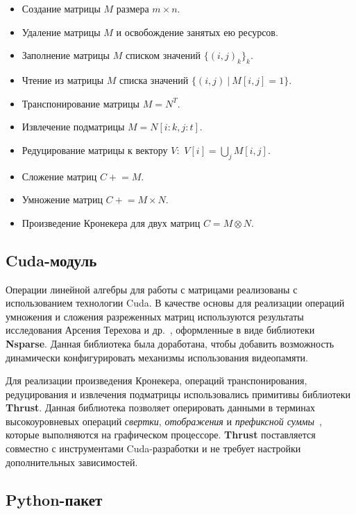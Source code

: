 \begin{itemize}[noitemsep,topsep=0pt,parsep=0pt,partopsep=0pt]
    \item Создание матрицы $M$ размера $m \times n$.
    \item Удаление матрицы $M$ и освобождение занятых ею ресурсов.
    \item Заполнение матрицы $M$ списком значений $\{(i, j)_k\}_k$.
    \item Чтение из матрицы $M$ списка значений $\{(i, j)~|~M[i,j]=1\}$.
    \item Транспонирование матрицы $M = N^T$.
    \item Извлечение подматрицы $M = N[i:k, j:t]$.
    \item Редуцирование матрицы к вектору $V$:~$V[i]=\bigcup_j M[i,j]$.
    \item Сложение матриц $C \mathrel{+}= M$.
    \item Умножение матриц $C \mathrel{+}= M \times N$.
    \item Произведение Кронекера для двух матриц $C = M \otimes N$.
\end{itemize}

\subsection{Cuda-модуль}

Операции линейной алгебры для работы с матрицами реализованы с использованием технологии Cuda. 
В качестве основы для реализации операций умножения и сложения разреженных матриц используются результаты исследования Арсения Терехова и др.~\cite{inproceedings:cfqp_matrix_with_single_source}, оформленные в виде библиотеки \textbf{Nsparse}.
Данная библиотека была доработана, чтобы добавить возможность динамически конфигурировать механизмы использования видеопамяти. 

Для реализации произведения Кронекера, операций транспонирования, редуцирования и извлечения подматрицы использовались примитивы библиотеки \textbf{Thrust}.
Данная библиотека позволяет оперировать данными в терминах высокоуровневых операций \textit{свертки}, \textit{отображения} и \textit{префиксной суммы}~\cite{net:cuda_thrust}, которые выполняются на графическом процессоре. 
\textbf{Thrust} поставляется совместно с инструментами Cuda-разработки и не требует настройки дополнительных зависимостей.

\subsection{Python-пакет}

